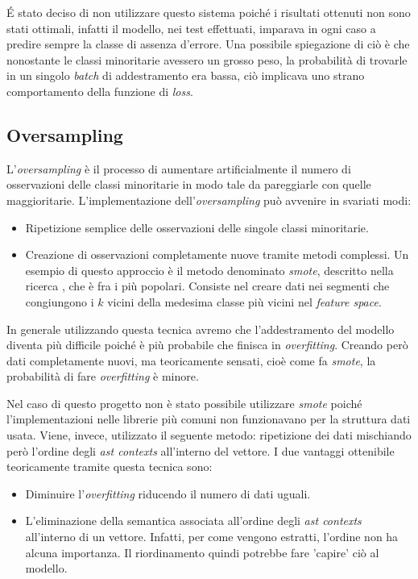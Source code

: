\'E stato deciso di non utilizzare questo sistema poiché i risultati ottenuti non sono stati ottimali, infatti il modello, nei test effettuati, imparava in ogni caso a predire sempre la classe di assenza d'errore.
Una possibile spiegazione di ciò è che nonostante le classi minoritarie avessero un grosso peso, la probabilità di trovarle in un singolo \textit{batch} di addestramento era bassa, ciò implicava uno strano comportamento della funzione di \textit{loss}. 
 
\subsection{Oversampling}
L'\textit{oversampling} è il processo di aumentare artificialmente il numero di osservazioni delle classi minoritarie in modo tale da pareggiarle con quelle maggioritarie.
L'implementazione dell'\textit{oversampling} può avvenire in svariati modi:
    \begin{itemize}
        \item Ripetizione semplice delle osservazioni delle singole classi minoritarie.
        \item Creazione di osservazioni completamente nuove tramite metodi complessi. Un esempio di questo approccio è il metodo denominato \textit{smote}, descritto nella ricerca \cite{chawla2002smote}, che è fra i più popolari.
         Consiste nel creare dati nei segmenti che congiungono i $k$ vicini della medesima classe più vicini nel \textit{feature space}.
    \end{itemize}
In generale utilizzando questa tecnica avremo che l'addestramento del modello diventa più difficile poiché è più probabile che finisca in \textit{overfitting}.
Creando però dati completamente nuovi, ma teoricamente sensati, cioè come fa \textit{smote}, la probabilità di fare \textit{overfitting} è minore.

Nel caso di questo progetto non è stato possibile utilizzare \textit{smote} poiché l'implementazioni nelle librerie più comuni non funzionavano per la struttura dati usata.
Viene, invece, utilizzato il seguente metodo: ripetizione dei dati mischiando però l'ordine degli \textit{ast contexts} all'interno del vettore.
I due vantaggi ottenibile teoricamente tramite questa tecnica sono:
    \begin{itemize}
        \item Diminuire l'\textit{overfitting} riducendo il numero di dati uguali.
        \item L'eliminazione della semantica associata all'ordine degli \textit{ast contexts} all'interno di un vettore. Infatti, per come vengono estratti, l'ordine non ha alcuna importanza.
            Il riordinamento quindi potrebbe fare 'capire' ciò al modello.
    \end{itemize}

